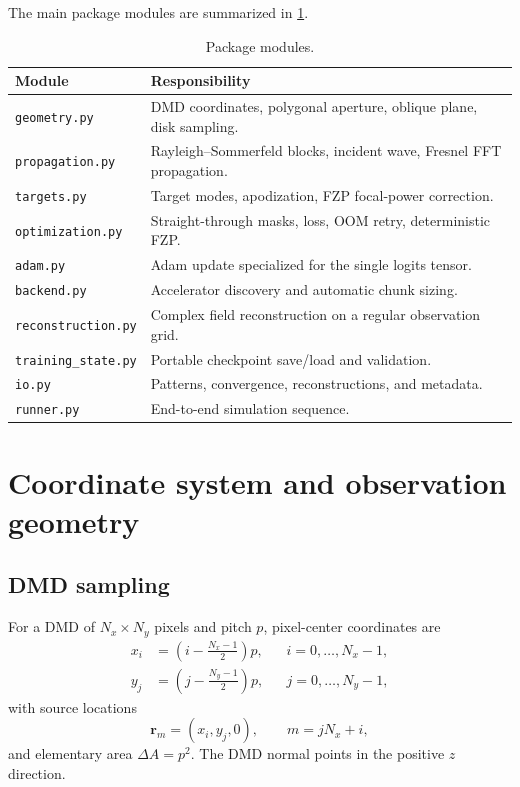 \documentclass[11pt,a4paper]{article}
\newcommand{\vect}[1]{\bm{#1}}
\begin{document}
The main package modules are summarized in \cref{tab:modules}.
\begin{table}[H]
\centering
\caption{Package modules.}
\label{tab:modules}
\begin{tabularx}{\textwidth}{@{}lX@{}}
\toprule
Module & Responsibility \\
\midrule
\texttt{geometry.py} & DMD coordinates, polygonal aperture, oblique plane, disk sampling. \\
\texttt{propagation.py} & Rayleigh--Sommerfeld blocks, incident wave, Fresnel FFT propagation. \\
\texttt{targets.py} & Target modes, apodization, FZP focal-power correction. \\
\texttt{optimization.py} & Straight-through masks, loss, OOM retry, deterministic FZP. \\
\texttt{adam.py} & Adam update specialized for the single logits tensor. \\
\texttt{backend.py} & Accelerator discovery and automatic chunk sizing. \\
\texttt{reconstruction.py} & Complex field reconstruction on a regular observation grid. \\
\texttt{training\_state.py} & Portable checkpoint save/load and validation. \\
\texttt{io.py} & Patterns, convergence, reconstructions, and metadata. \\
\texttt{runner.py} & End-to-end simulation sequence. \\
\bottomrule
\end{tabularx}
\end{table}

\section{Coordinate system and observation geometry}
\subsection{DMD sampling}
For a DMD of $N_x\times N_y$ pixels and pitch $p$, pixel-center coordinates are
\begin{align}
 x_i &= \left(i-\frac{N_x-1}{2}\right)p, && i=0,\ldots,N_x-1,\\
 y_j &= \left(j-\frac{N_y-1}{2}\right)p, && j=0,\ldots,N_y-1,
\end{align}
with source locations
\begin{equation}
 \vect r_m=(x_i,y_j,0),\qquad m=jN_x+i,
\end{equation}
and elementary area $\Delta A=p^2$. The DMD normal points in the positive $z$ direction.
\end{document}
